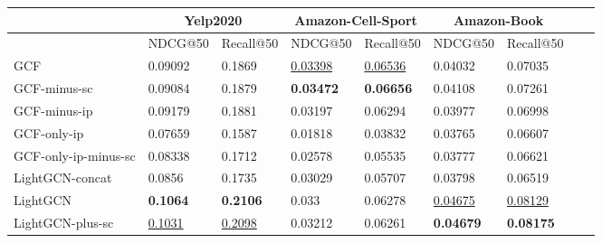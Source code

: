 \begin{table}[]
    \centering
    \begin{tabular}{|l|l|l|l|l|l|l|l|l|}
        \hline
                             & \multicolumn{2}{c|}{Yelp2020} & \multicolumn{2}{c|}{Amazon-Cell-Sport} & \multicolumn{2}{c|}{Amazon-Book}                                                                   \\ \hline
                             & NDCG@50                       & Recall@50                              & NDCG@50                          & Recall@50           & NDCG@50             & Recall@50           \\ \hline
        GCF                  & 0.09092                       & 0.1869                                 & \underline{0.03398}              & \underline{0.06536} & 0.04032             & 0.07035             \\ \hline
        GCF-minus-sc         & 0.09084                       & 0.1879                                 & \textbf{0.03472}                 & \textbf{0.06656}    & 0.04108             & 0.07261             \\ \hline
        GCF-minus-ip         & 0.09179                       & 0.1881                                 & 0.03197                          & 0.06294             & 0.03977             & 0.06998             \\ \hline
        GCF-only-ip          & 0.07659                       & 0.1587                                 & 0.01818                          & 0.03832             & 0.03765             & 0.06607             \\ \hline
        GCF-only-ip-minus-sc & 0.08338                       & 0.1712                                 & 0.02578                          & 0.05535             & 0.03777             & 0.06621             \\ \hline
        LightGCN-concat      & 0.0856                        & 0.1735                                 & 0.03029                          & 0.05707             & 0.03798             & 0.06519             \\ \hline
        LightGCN             & \textbf{0.1064}               & \textbf{0.2106}                        & 0.033                            & 0.06278             & \underline{0.04675} & \underline{0.08129} \\ \hline
        LightGCN-plus-sc     & \underline{0.1031}            & \underline{0.2098}                     & 0.03212                          & 0.06261             & \textbf{0.04679}    & \textbf{0.08175}    \\ \hline

\end{tabular}
\end{table}
